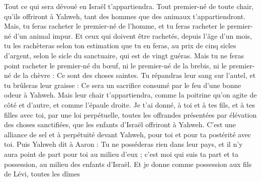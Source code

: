 \begin{multicols}{2}
Tout ce qui sera dévoué en Israël t'appartiendra.
Tout premier-né de toute chair, qu'ils offriront à Yahweh, tant des hommes que des animaux t'appartiendront. Mais, tu feras racheter le premier-né de l'homme, et tu feras racheter le premier-né d'un animal impur.
Et ceux qui doivent être rachetés, depuis l'âge d'un mois, tu les rachèteras selon ton estimation que tu en feras, au prix de cinq sicles d'argent, selon le sicle du sanctuaire, qui est de vingt guéras.
Mais tu ne feras point racheter le premier-né du bœuf, ni le premier-né de la brebis, ni le premier-né de la chèvre : Ce sont des choses saintes. Tu répandras leur sang sur l'autel, et tu brûleras leur graisse : Ce sera un sacrifice consumé par le feu d'une bonne odeur à Yahweh.
Mais leur chair t'appartiendra, comme la poitrine qu'on agite de côté et d'autre, et comme l'épaule droite.
Je t'ai donné, à toi et à tes fils, et à tes filles avec toi, par une loi perpétuelle, toutes les offrandes présentées par élévation des choses sanctifiées, que les enfants d'Israël offriront à Yahweh. C'est une alliance de sel et à perpétuité devant Yahweh, pour toi et pour ta postérité avec toi.
Puis Yahweh dit à Aaron : Tu ne posséderas rien dans leur pays, et il n'y aura point de part pour toi au milieu d'eux ; c'est moi qui suis ta part et ta possession, au milieu des enfants d'Israël.
Et je donne comme possession aux fils de Lévi, toutes les dîmes
\end{multicols}
